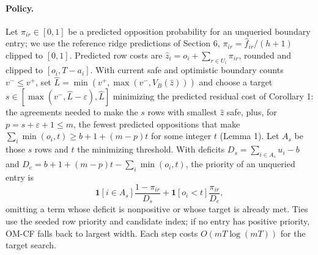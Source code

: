 \documentclass[11pt]{article}
\newcommand{\ind}{\mathbf{1}}
\begin{document}
\paragraph{Policy.} Let $\pi_{ir}\in[0,1]$ be a predicted opposition probability for an unqueried boundary entry; we use the reference ridge predictions of Section 6, $\pi_{ir}=\hat f_{ir}/(h+1)$ clipped to $[0,1]$. Predicted row costs are $\hat z_i=o_i+\sum_{r\in U_i}\pi_{ir}$, rounded and clipped to $[o_i,T-a_i]$. With current safe and optimistic boundary counts $v^-\le v^+$, set $\hat L=\min(v^+,\max(v^-,V_B(\hat z)))$ and choose a target $s\in[\max(v^-,\hat L-\varepsilon),\hat L]$ minimizing the predicted residual cost of Corollary 1: the agreements needed to make the $s$ rows with smallest $\hat z$ safe, plus, for $p=s+\varepsilon+1\le m$, the fewest predicted oppositions that make $\sum_i\min(o_i,t)\ge b+1+(m-p)t$ for some integer $t$ (Lemma 1). Let $A_s$ be those $s$ rows and $t$ the minimizing threshold. With deficits $D_s=\sum_{i\in A_s}u_i-b$ and $D_e=b+1+(m-p)t-\sum_i\min(o_i,t)$, the priority of an unqueried entry is
\[
\ind[i\in A_s]\frac{1-\pi_{ir}}{D_s}+\ind[o_i<t]\frac{\pi_{ir}}{D_e},
\]
omitting a term whose deficit is nonpositive or whose target is already met. Ties use the seeded row priority and candidate index; if no entry has positive priority, OM-CF falls back to largest width. Each step costs $O(mT\log(mT))$ for the target search.
\end{document}

